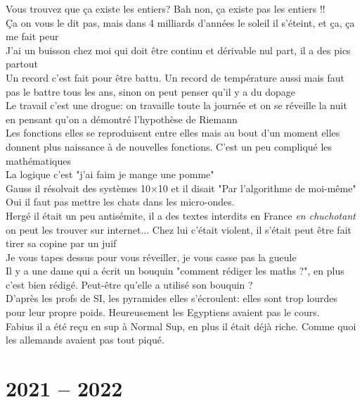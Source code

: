 \documentclass[french, a4paper, openany]{book}
\begin{document}
	\noindent \og Vous trouvez que ça existe les entiers? Bah non, ça existe pas les entiers !! \fg \\
	\og Ça on vous le dit pas, mais dans 4 milliards d'années le soleil il s'éteint, et ça, ça me fait peur \fg \\
	\og J'ai un buisson chez moi qui doit être continu et dérivable nul part, il a des pics partout \fg \\
	\og Un record c'est fait pour être battu. Un record de température aussi mais faut pas le battre tous les ans, sinon on peut penser qu'il y a du dopage \fg \\
	\og Le travail c'est une drogue: on travaille toute la journée et on se réveille la nuit en pensant qu'on a démontré l'hypothèse de Riemann \fg \\
	\og Les fonctions elles se reproduisent entre elles mais au bout d'un moment elles donnent plus naissance à de nouvelles fonctions. C'est un peu compliqué les mathématiques \fg \\
	\og La logique c'est "j'ai faim je mange une pomme" \fg \\
	\og Gauss il résolvait des systèmes 10×10 et il disait "Par l'algorithme de moi-même" \fg \\
	\og Oui il faut pas mettre les chats dans les micro-ondes. \fg \\
	\og Hergé il était un peu antisémite, il a des textes interdits en France \emph{en chuchotant} on peut les trouver sur internet... Chez lui c'était violent, il s'était peut être fait tirer sa copine par un juif \fg \\
	\og Je vous tapes dessus pour vous réveiller, je vous casse pas la gueule \fg \\
	\og Il y a une dame qui a écrit un bouquin "comment rédiger les maths ?", en plus c'est bien rédigé. Peut-être qu'elle a utilisé son bouquin ? \fg \\
	\og D'après les profs de SI, les pyramides elles s'écroulent: elles sont trop lourdes pour leur propre poids. Heureusement les Egyptiens avaient pas le cours. \fg \\
	\og Fabius il a été reçu en sup à Normal Sup, en plus il était déjà riche. Comme quoi les allemands avaient pas tout piqué. \fg \\
	
\section{2021 -- 2022}
\end{document}
